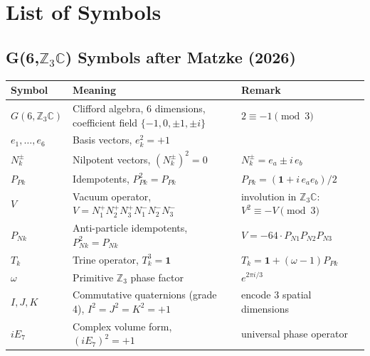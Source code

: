 %

\section*{List of Symbols}

\subsection*{G(6,$\mathbb{Z}_3\mathbb{C}$) Symbols after Matzke (2026)}

\begin{center}
\begin{tabular}{lll}
\toprule
Symbol & Meaning & Remark \\
\midrule
$G(6,\mathbb{Z}_3\mathbb{C})$ & Clifford algebra, 6 dimensions,
  coefficient field $\{-1,0,\pm1,\pm i\}$ & $2\equiv-1\pmod{3}$ \\
$e_1,\ldots,e_6$ & Basis vectors, $e_k^2 = +1$ & \\
$N_k^{\pm}$ & Nilpotent vectors, $(N_k^{\pm})^2 = 0$ &
  $N_k^{\pm} = e_a \pm i\,e_b$ \\
$P_{Pk}$ & Idempotents, $P_{Pk}^2 = P_{Pk}$ &
  $P_{Pk} = (\mathbf{1}+i\,e_a e_b)/2$ \\
$V$ & Vacuum operator, $V = N_1^+N_2^+N_3^+N_1^-N_2^-N_3^-$ &
  involution in $\mathbb{Z}_3\mathbb{C}$: $V^2 \equiv -V \pmod{3}$ \\
$P_{Nk}$ & Anti-particle idempotents, $P_{Nk}^2 = P_{Nk}$ &
  $V = -64\cdot P_{N1}P_{N2}P_{N3}$ \\
$T_k$ & Trine operator, $T_k^3 = \mathbf{1}$ &
  $T_k = \mathbf{1}+(\omega-1)P_{Pk}$ \\
$\omega$ & Primitive $\mathbb{Z}_3$ phase factor &
  $e^{2\pi i/3}$ \\
$I,J,K$ & Commutative quaternions (grade 4), $I^2=J^2=K^2=+1$ &
  encode 3 spatial dimensions \\
$iE_7$ & Complex volume form, $(iE_7)^2=+1$ & universal phase operator \\
\bottomrule
\end{tabular}
\end{center}

